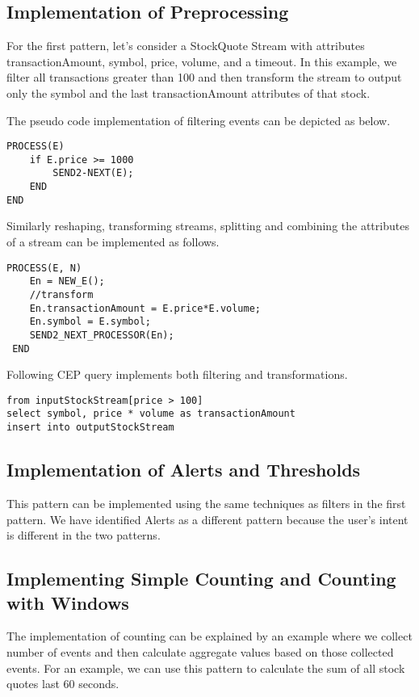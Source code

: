 \documentclass{sig-alternate}
\begin{document}
{\subsection{Implementation of Preprocessing}

For the first pattern, let's consider a StockQuote Stream with attributes transactionAmount, symbol, price, volume, and a timeout. In this example, we filter all transactions greater than 100 and then transform the stream to output only the symbol and the last transactionAmount attributes of that stock. 

The pseudo code implementation of filtering events can be depicted as below. 


\begin{lstlisting}[mathescape, showstringspaces=false]
PROCESS(E) 
	if E.price >= 1000
		SEND2-NEXT(E); 
	END
END
\end{lstlisting}


Similarly reshaping, transforming streams, splitting and combining the attributes of a stream can be implemented as follows.

\begin{lstlisting}[mathescape, showstringspaces=false]
PROCESS(E, N) 
	En = NEW_E(); 
	//transform
	En.transactionAmount = E.price*E.volume;
	En.symbol = E.symbol;
	SEND2_NEXT_PROCESSOR(En); 
 END
\end{lstlisting}


Following CEP query implements both filtering and transformations. 

\begin{lstlisting}[mathescape, showstringspaces=false]
from inputStockStream[price > 100]
select symbol, price * volume as transactionAmount
insert into outputStockStream 
\end{lstlisting}



\subsection{Implementation of Alerts and Thresholds}
This pattern can be implemented using the same techniques as filters in the first pattern. We have identified Alerts as a different pattern because the user's intent is different in the two patterns. 


\subsection{Implementing Simple Counting and Counting with Windows}
The implementation of counting can be explained by an example where we collect number of events and then calculate aggregate values based on those collected events. For an example, we can use this pattern to calculate the sum of all stock quotes last 60 seconds. 

}
\end{document}
